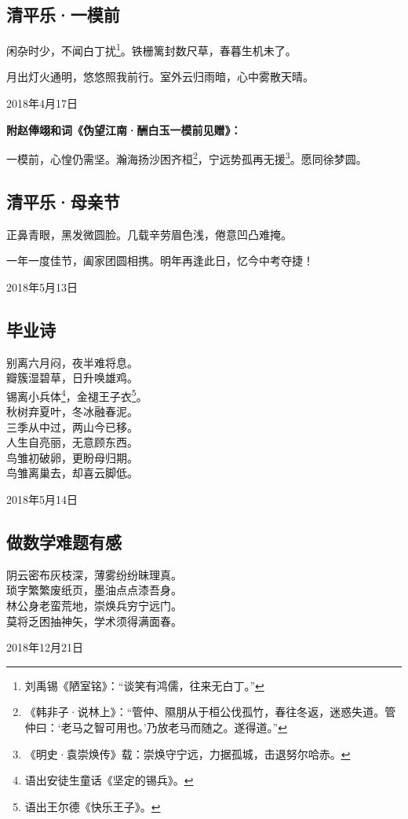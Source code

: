 \documentclass[a5paper]{ctexart}
\begin{document}
	\subsection{清平乐·一模前}
	闲杂时少，不闻白丁扰\footnote{刘禹锡《陋室铭》：“谈笑有鸿儒，往来无白丁。”}。铁栅篱封数尺草，春暮生机未了。
	
	月出灯火通明，悠悠照我前行。室外云归雨暗，心中雾散天晴。
	\begin{flushright}
		2018年4月17日
	\end{flushright}
	\begin{flushleft}
		\textbf{附赵俸翊和词《伪望江南·酬白玉一模前见赠》：}
	\end{flushleft}
	
		一模前，心惶仍需坚。瀚海扬沙困齐桓\footnote{《韩非子·说林上》：“管仲、隰朋从于桓公伐孤竹，春往冬返，迷惑失道。管仲曰：‘老马之智可用也。’乃放老马而随之。遂得道。”}，宁远势孤再无援\footnote{《明史·袁崇焕传》载：崇焕守宁远，力据孤城，击退努尔哈赤。}。愿同徐梦圆。

	
	\subsection{清平乐·母亲节}
	正鼻青眼，黑发微圆脸。几载辛劳眉色浅，倦意凹凸难掩。
	
	一年一度佳节，阖家团圆相携。明年再逢此日，忆今中考夺捷！
	\begin{flushright}
		2018年5月13日
	\end{flushright}

	
	
	\subsection{毕业诗}
	\begin{center}
		别离六月闷，夜半难将息。\\
		瓣簇湿碧草，日升唤雄鸡。\\
		锡离小兵体\footnote{语出安徒生童话《坚定的锡兵》。}，金褪王子衣\footnote{语出王尔德《快乐王子》。}。\\
		秋树弃夏叶，冬冰融春泥。\\
		三季从中过，两山今已移。\\
		人生自亮丽，无意顾东西。\\
		鸟雏初破卵，更盼母归期。\\
		鸟雏离巢去，却喜云脚低。 
	\end{center}
	\hfill 2018年5月14日
	
	\subsection{做数学难题有感}
	\begin{center}
		阴云密布灰枝深，薄雾纷纷昧理真。\\
		琐字繁繁废纸页，墨油点点漆吾身。\\
		林公身老蛮荒地，崇焕兵穷宁远门。\\
		莫将乏困抽神矢，学术须得满面春。
		
	\end{center}
	\hfill 2018年12月21日
	\newpage
	
\end{document}
